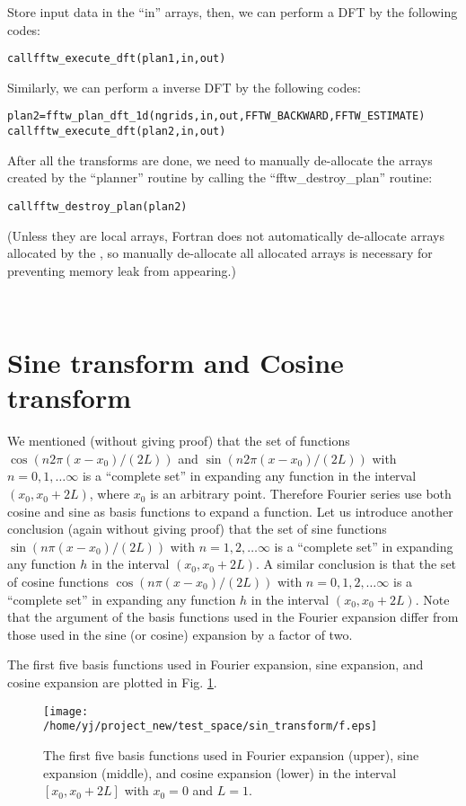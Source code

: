 \documentclass{article}
\newcommand{\codestar}[1]{\text{{\bfseries{#1}}}}
\newenvironment{tmcode}[1][]{\begin{alltt} }{\end{alltt}}
\begin{document}
Store input data in the ``in'' arrays, then, we can perform a DFT by the
following codes:
\begin{tmcode}
call fftw_execute_dft(plan1, in, out)
\end{tmcode}
Similarly, we can perform a inverse DFT by the following codes:
\begin{tmcode}
plan2 = fftw_plan_dft_1d(ngrids, in,out,FFTW_BACKWARD,FFTW_ESTIMATE)
call fftw_execute_dft(plan2, in, out)
\end{tmcode}
After all the transforms are done, we need to manually de-allocate the arrays
created by the ``planner'' routine by calling the ``fftw\_destroy\_plan''
routine:
\begin{tmcode}
call fftw_destroy_plan(plan2)
\end{tmcode}
(Unless they are local arrays, Fortran does not automatically de-allocate
arrays allocated by the {\codestar{acllocate()}}, so manually de-allocate all
allocated arrays is necessary for preventing memory leak from appearing.)

\

\section{Sine transform and Cosine transform}

We mentioned (without giving proof) that the set of functions $\cos (n 2 \pi
(x - x_0) / (2 L))$ and $\sin (n 2 \pi (x - x_0) / (2 L))$ with $n = 0, 1,
\ldots \infty$ is a ``complete set'' in expanding any function in the interval
$(x_0, x_0 + 2 L)$, where $x_0$ is an arbitrary point. Therefore Fourier
series use both cosine and sine as basis functions to expand a function. Let
us introduce another conclusion (again without giving proof) that the set of
sine functions $\sin (n \pi (x - x_0) / (2 L))$ with $n = 1, 2, \ldots \infty$
is a ``complete set'' in expanding any function $h$ in the interval $(x_0, x_0
+ 2 L)$. A similar conclusion is that the set of cosine functions $\cos (n \pi
(x - x_0) / (2 L))$ with $n = 0, 1, 2, \ldots \infty$ is a ``complete set'' in
expanding any function $h$ in the interval $(x_0, x_0 + 2 L)$. Note that the
argument of the basis functions used in the Fourier expansion differ from
those used in the sine (or cosine) expansion by a factor of two.

The first five basis functions used in Fourier expansion, sine expansion, and
cosine expansion are plotted in Fig. \ref{18-1-10-e1}.

\begin{figure}[h]
  \texttt{[image: /home/yj/project\_new/test\_space/sin\_transform/f.eps]}
  \caption{ \label{18-1-10-e1}The first five basis functions used in Fourier
  expansion (upper), sine expansion (middle), and cosine expansion (lower) in
  the interval $[x_0, x_0 + 2 L]$ with $x_0 = 0$ and $L = 1$.}
\end{figure}
\end{document}
